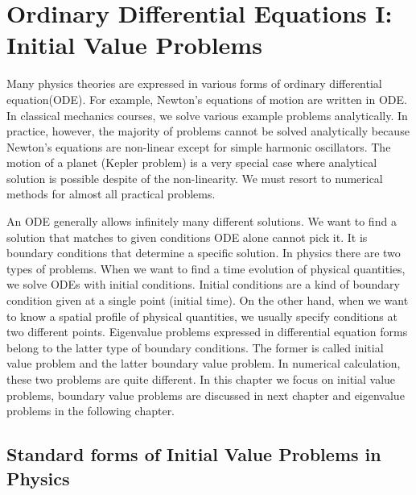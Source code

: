 \chapter{Ordinary Differential Equations I:\\ {Initial Value Problems}}\label{ch:ode1}
 
Many physics theories are expressed in various forms of ordinary differential equation(ODE). 
For example, Newton's equations of motion are written in ODE.  In classical mechanics courses, we solve various example problems analytically.  In practice, however, the majority of problems cannot be solved analytically because Newton's equations are non-linear except for simple harmonic oscillators.  The motion of a planet (Kepler problem) is a very special case where analytical solution is possible despite of the non-linearity. We must resort to numerical methods for almost all practical problems.

An ODE generally allows infinitely many different solutions. We want to find a solution that matches to given conditions  ODE alone cannot pick it.  It is boundary conditions that determine a specific solution.  In physics there are two types of problems.  When we want to find a time evolution of physical quantities, we solve ODEs with initial conditions.  Initial conditions are a kind of boundary condition given at a single point (initial time).  On the other hand, when we want to know a spatial profile of physical quantities, we usually specify conditions at two different points.  Eigenvalue problems expressed in differential equation forms belong to the latter type of boundary conditions.  The former is called initial value problem and the latter boundary value problem.  In numerical calculation, these two problems are quite different.  In this chapter we focus on initial value problems, boundary value problems are discussed in next chapter and eigenvalue problems in the following chapter. 


\section{Standard forms of Initial Value Problems in Physics}
 
